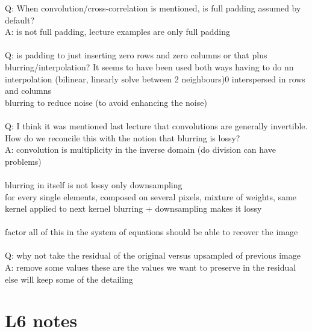 \documentclass[11pt]{article}
\begin{document}
Q: When convolution/cross-correlation is mentioned, is full padding assumed by default?\\
A: is not full padding, lecture examples are only full padding
\\\\
\noindent
Q: is padding to just inserting zero rows and zero columns or that plus blurring/interpolation? It seems to have been used both ways
having to do nn interpolation (bilinear, linearly solve between 2 neighbours)0 interspersed in rows and columns
\\
blurring to reduce noise (to avoid enhancing the noise)
\\\\
Q: I think it was mentioned last lecture that convolutions are generally invertible. How do we reconcile this with the notion that blurring is lossy?\\
A: convolution is multiplicity in the inverse domain (do division can have problems)\\\\
blurring in itself is not lossy
only downsampling
\\
for every single elements, composed on several pixels, mixture of weights, same kernel applied to next kernel
blurring + downsampling makes it lossy
\\\\
factor all of this in the system of equations should be able to recover the image
\\\\
Q: why not take the residual of the original versus upsampled of previous image\\
A: remove some values these are the values we want to preserve in the residual
else will keep some of the detailing 
\\
\section*{L6 notes}
\end{document}
